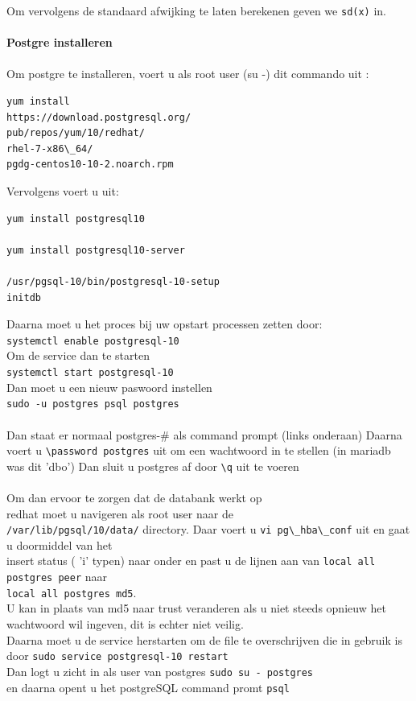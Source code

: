 \documentclass[fleqn,10pt]{artikeltin}
\begin{document}
Om vervolgens de standaard afwijking te laten berekenen geven we \verb|sd(x)| in.\\\\
\textbf{Postgre installeren}\\\\
Om postgre te installeren, voert u als root user (su -) dit commando uit :\\
\begin{lstlisting}
yum install
https://download.postgresql.org/
pub/repos/yum/10/redhat/
rhel-7-x86\_64/
pgdg-centos10-10-2.noarch.rpm
\end{lstlisting}
Vervolgens voert u uit:
\begin{lstlisting}
yum install postgresql10

yum install postgresql10-server

/usr/pgsql-10/bin/postgresql-10-setup
initdb
\end{lstlisting}
Daarna moet u het proces bij uw opstart processen zetten door:\\
 \verb|systemctl enable postgresql-10|\\
Om de service dan te starten\\
 \verb|systemctl start postgresql-10|\\
Dan moet u een nieuw paswoord instellen \\
 \verb|sudo -u postgres psql postgres|\\\\
Dan staat er normaal postgres-\# als command prompt (links onderaan)
Daarna voert u \verb|\password postgres| uit om een wachtwoord in te stellen (in mariadb was dit 'dbo')
Dan sluit u postgres af door \verb|\q| uit te voeren\\\\
Om dan ervoor te zorgen dat de databank werkt op \\redhat moet u navigeren als root user naar de \\
\verb|/var/lib/pgsql/10/data/| directory.
Daar voert u 
\verb|vi pg\_hba\_conf|
uit en gaat u doormiddel van het \\insert status ( 'i' typen) naar onder en past u de lijnen aan van 
\verb|local all postgres peer|
naar\\
\verb|local all postgres md5|.\\
U kan in plaats van md5 naar trust veranderen als u niet steeds opnieuw het wachtwoord wil ingeven,
dit is echter niet veilig.\\
Daarna moet u de service herstarten om de file te overschrijven die in gebruik is door 
\verb|sudo service postgresql-10 restart|\\
Dan logt u zicht in als user van postgres
\verb|sudo su - postgres|\\
en daarna opent u het postgreSQL command promt 
\verb|psql|\\
\end{document}

